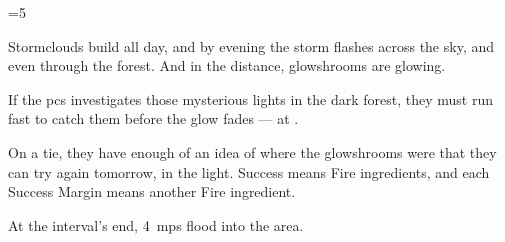 \ifnum\value{cycle}=5


Stormclouds build all day, and by evening the storm flashes across the sky, and even through the forest.
And in the distance, \glspl{glowshroom} are glowing.

If the \glspl{pc} investigates those mysterious lights in the dark forest, they must run fast to catch them before the glow fades ---  at \tn[9].

On a tie, they have enough of an idea of where the \glspl{glowshroom} were that they can try again tomorrow, in the light.
Success means  Fire \glspl{ingredient}, and each Success Margin means another Fire \gls{ingredient}.

At the \gls{interval}'s end, 4~\glspl{mp} flood into the area.

\fi
